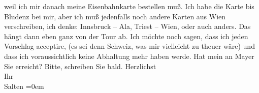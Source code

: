 \begin{ledgroupsized}[t]{13cm}
               weil ich mir danach meine Eisenbahnkarte bestellen muß. Ich habe die Karte bis Bludenz bei mir, aber ich muß jedenfalls noch
               andere Karten aus Wien verschreiben, ich denke:
                  Innsbruck – Ala, Triest – Wien, oder auch anders. Das hängt dann eben ganz von der Tour
               ab. {\pb}Ich möchte noch sagen,
               dass ich jeden Vorschlag acceptire, (es sei denn Schweiz, was mir vielleicht zu theuer wäre) und dass ich voraussichtlich keine
               Abhaltung mehr haben werde. \pend
           \pstart
           Hat mein \label{K_L03310-1v}\label{K_L03310-1h} an Mayer Sie erreicht? \pend
           \pstart
           Bitte, schreiben Sie bald. \pend
           \pstart
           Herzlichst {\\[\baselineskip]}Ihr {\\[\baselineskip]}\spacefill\mbox{Salten}\pend
           \leftskip=0em{}
         
         \endnumbering{}\end{ledgroupsized}\begin{anhang}\end{anhang}\newcommand{\dateiname}{L03310}\newcommand{\titel}{Felix Salten an Arthur Schnitzler, 14. 8. 1900}\newcommand{\editorInnen}{Martin Anton Müller und Laura Untner}
      